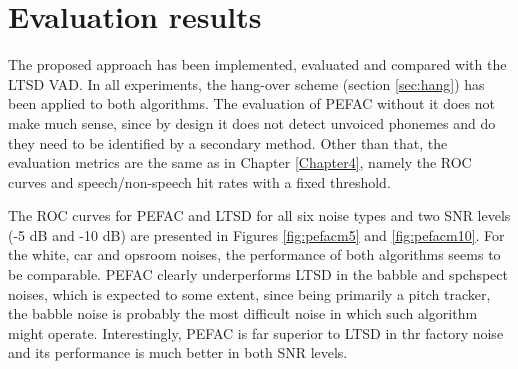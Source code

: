 
\section{Evaluation results}

The proposed approach has been implemented, evaluated and compared with the LTSD VAD. In all experiments, the hang-over scheme (section \ref{sec:hang}) has been applied to both algorithms. The evaluation of PEFAC without it does not make much sense, since by design it does not detect unvoiced phonemes and do they need to be identified by a secondary method. Other than that, the evaluation metrics are the same as in Chapter \ref{Chapter4}, namely the ROC curves and speech/non-speech hit rates with a fixed threshold.

The ROC curves for PEFAC and LTSD for all six noise types and two SNR levels (-5 dB and -10 dB) are presented in Figures \ref{fig:pefacm5} and \ref{fig:pefacm10}. For the white, car and opsroom noises, the performance of both algorithms seems to be comparable. PEFAC clearly underperforms LTSD in the babble and spchspect noises, which is expected to some extent, since being primarily a pitch tracker, the babble noise is probably the most difficult noise in which such algorithm might operate. Interestingly, PEFAC is far superior to LTSD in thr factory noise and its performance is much better in both SNR levels.

